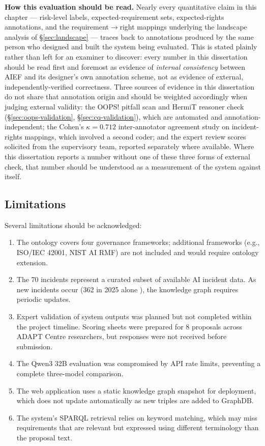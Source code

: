 \textbf{How this evaluation should be read.} Nearly every quantitative claim in this chapter --- risk-level labels, expected-requirement sets, expected-rights annotations, and the requirement$\to$right mappings underlying the landscape analysis of \S\ref{sec:landscape} --- traces back to annotations produced by the same person who designed and built the system being evaluated. This is stated plainly rather than left for an examiner to discover: every number in this dissertation should be read first and foremost as evidence of \emph{internal consistency} between AIEF and its designer's own annotation scheme, not as evidence of external, independently-verified correctness. Three sources of evidence in this dissertation do not share that annotation origin and should be weighted accordingly when judging external validity: the OOPS! pitfall scan and HermiT reasoner check (\S\ref{sec:oops-validation}, \S\ref{sec:cq-validation}), which are automated and annotation-independent; the Cohen's $\kappa=0.712$ inter-annotator agreement study on incident-rights mappings, which involved a second coder; and the expert review scores solicited from the supervisory team, reported separately where available. Where this dissertation reports a number without one of these three forms of external check, that number should be understood as a measurement of the system against itself.

\subsection{Limitations}

Several limitations should be acknowledged:

\begin{enumerate}
\item The ontology covers four governance frameworks; additional frameworks (e.g., ISO/IEC 42001, NIST AI RMF) are not included and would require ontology extension.

\item The 70 incidents represent a curated subset of available AI incident data. As new incidents occur (362 in 2025 alone \cite{stanfordaiindex2026}), the knowledge graph requires periodic updates.

\item Expert validation of system outputs was planned but not completed within the project timeline. Scoring sheets were prepared for 8 proposals across ADAPT Centre researchers, but responses were not received before submission.

\item The Qwen3 32B evaluation was compromised by API rate limits, preventing a complete three-model comparison.

\item The web application uses a static knowledge graph snapshot for deployment, which does not update automatically as new triples are added to GraphDB.

\item The system's SPARQL retrieval relies on keyword matching, which may miss requirements that are relevant but expressed using different terminology than the proposal text.
\end{enumerate}
